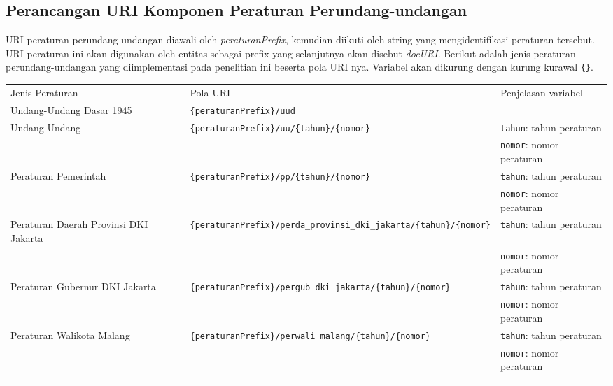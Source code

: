 \subsection{Perancangan URI Komponen Peraturan
Perundang-undangan}\label{perancangan-uri-komponen-peraturan-perundang-undangan}

URI peraturan perundang-undangan diawali oleh \emph{peraturanPrefix},
kemudian diikuti oleh string yang mengidentifikasi peraturan tersebut.
URI peraturan ini akan digunakan oleh entitas sebagai prefix yang
selanjutnya akan disebut \emph{docURI}. Berikut adalah jenis peraturan
perundang-undangan yang diimplementasi pada penelitian ini beserta pola
URI nya. Variabel akan dikurung dengan kurung kurawal \texttt{\{\}}.

\begin{longtable}[c]{@{}lll@{}}
\toprule\addlinespace
Jenis Peraturan & Pola URI & Penjelasan variabel
\\\addlinespace
\midrule\endhead
Undang-Undang Dasar 1945 & \texttt{\{peraturanPrefix\}/uud} &
\\\addlinespace
Undang-Undang & \texttt{\{peraturanPrefix\}/uu/\{tahun\}/\{nomor\}} &
\texttt{tahun}: tahun peraturan
\\\addlinespace
& & \texttt{nomor}: nomor peraturan
\\\addlinespace
Peraturan Pemerintah &
\texttt{\{peraturanPrefix\}/pp/\{tahun\}/\{nomor\}} & \texttt{tahun}:
tahun peraturan
\\\addlinespace
& & \texttt{nomor}: nomor peraturan
\\\addlinespace
Peraturan Daerah Provinsi DKI Jakarta &
\texttt{\{peraturanPrefix\}/perda\_provinsi\_dki\_jakarta/\{tahun\}/\{nomor\}}
& \texttt{tahun}: tahun peraturan
\\\addlinespace
& & \texttt{nomor}: nomor peraturan
\\\addlinespace
Peraturan Gubernur DKI Jakarta &
\texttt{\{peraturanPrefix\}/pergub\_dki\_jakarta/\{tahun\}/\{nomor\}} &
\texttt{tahun}: tahun peraturan
\\\addlinespace
& & \texttt{nomor}: nomor peraturan
\\\addlinespace
Peraturan Walikota Malang &
\texttt{\{peraturanPrefix\}/perwali\_malang/\{tahun\}/\{nomor\}} &
\texttt{tahun}: tahun peraturan
\\\addlinespace
& & \texttt{nomor}: nomor peraturan
\\\addlinespace
\bottomrule
\end{longtable}

